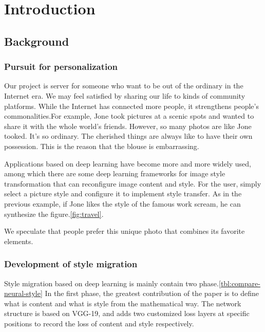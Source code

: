 
\section{Introduction}
\subsection{Background}\label{section:background}

\subsubsection{Pursuit for personalization}
Our project is server for someone who want to be out of the ordinary in the Internet era. We may feel satisfied by sharing our life to kinds of community platforms. While the Internet has connected more people, it strengthens people's commonalities.For example, Jone took pictures at a scenic spots and wanted to share it with the whole world's friends. However, so many photos are like Jone tooked. It's so ordinary. The cherished things are always like to have their own possession. This is the reason that the blouse is embarrassing.

Applications based on deep learning have become more and more widely used, among which there are some deep learning frameworks for image style transformation that can reconfigure image content and style.
For the user, simply select a picture style and configure it to implement style transfer.
As in the previous example, if Jone likes the style of the famous work scream, he can synthesize the figure.\ref{fig:travel}.

We speculate that people prefer this unique photo that combines its favorite elements. 

\subsubsection{Development of style migration}\label{section:neural-style}
Style migration based on deep learning is mainly contain two phase.\ref{tbl:compare-neural-style}
In the first phase, the greatest contribution of the paper is to define what is content and what is style from the mathematical way.
The network structure is based on VGG-19, and adds two customized loss layers at specific positions to record the loss of content and style respectively.

